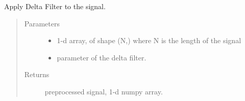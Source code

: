\documentclass[letterpaper,10pt,english]{sphinxmanual}
\begin{document}
\begin{fulllineitems}
\label{\detokenize{OBM:OBM.Preprocessing.dlta_filter}}
Apply Delta Filter to the signal.
\begin{quote}\begin{description}
\item[{Parameters}] \leavevmode\begin{itemize}
\item {} 
 \textendash{} 1-d array, of shape (N,) where N is the length of the signal

\item {} 
 \textendash{} parameter of the delta filter.

\end{itemize}

\item[{Returns}] \leavevmode
preprocessed signal, 1-d numpy array.

\end{description}\end{quote}

\end{fulllineitems}

\end{document}

